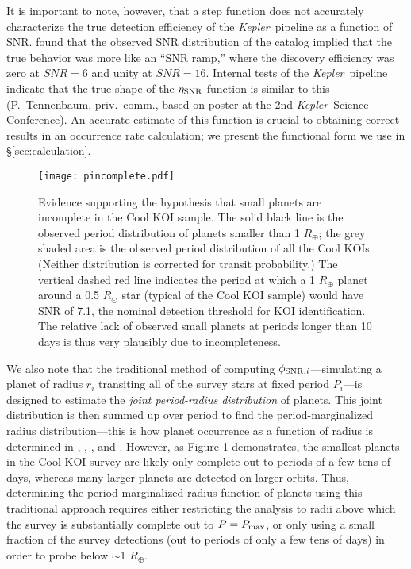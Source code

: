 \documentclass[iop]{emulateapj}
\def\Kepler{\textit{Kepler}}
\def\Rearth{R_\oplus}
\begin{document}
It is important to note, however, that a step function  does not accurately characterize the true detection efficiency of the \Kepler\ pipeline as a function of SNR.  \citet{fressin2013} found that the observed SNR distribution of the \citet{batalha2012} catalog implied that the true behavior was more like an ``SNR ramp,'' where the discovery efficiency was zero at $SNR=6$ and unity at $SNR=16$.  Internal tests of the \Kepler\ pipeline indicate that the true shape of the $\eta_{\rm SNR}$ function is similar to this (P.~Tennenbaum, priv.~comm., based on poster at the 2nd \Kepler\ Science Conference).  An accurate estimate of this function is crucial to obtaining correct results in an occurrence rate calculation; we present the functional form we use in \S\ref{sec:calculation}.


\begin{figure}[t!]
  \centering
   \texttt{[image: pincomplete.pdf]} %
   \caption{Evidence supporting the hypothesis that small planets are incomplete in the Cool KOI sample.  The solid black line is the observed period distribution of planets smaller than 1 $\Rearth$; the grey shaded area is the observed period distribution of all the Cool KOIs.  (Neither distribution is corrected for transit probability.)  The vertical dashed red line indicates the period at which a 1 $\Rearth$ planet around a 0.5 $R_\odot$ star (typical of the Cool KOI sample) would have SNR of 7.1, the nominal detection threshold for KOI identification.  The relative lack of observed small planets at periods longer than 10 days is thus very plausibly due to incompleteness.}
    \label{fig:pincomplete}
\end{figure}

We also note that the traditional method of computing $\phi_{{\rm SNR},i}$---simulating a planet of radius $r_i$ transiting all of the survey stars at fixed period $P_i$---is designed to estimate the \textit{joint period-radius distribution} of planets.  This joint distribution is then summed up over period to find the period-marginalized radius distribution---this is how planet occurrence as a function of radius is determined in \citet{howard2012}, \citet{dressing2013}, \citet{petigura2013}, and \citet{petigura2013b}.  However, as Figure \ref{fig:pincomplete} demonstrates, the smallest planets in the Cool KOI survey are likely only complete out to periods of a few tens of days, whereas many larger planets are detected on larger orbits.  Thus, determining the period-marginalized radius function of planets using this traditional approach requires either restricting the analysis to radii above which the survey is substantially complete out to $P=P_{\rm max}$, or only using a small fraction of the survey detections (out to periods of only a few tens of days) in order to probe below $\sim$1 $\Rearth$.  
\end{document}
